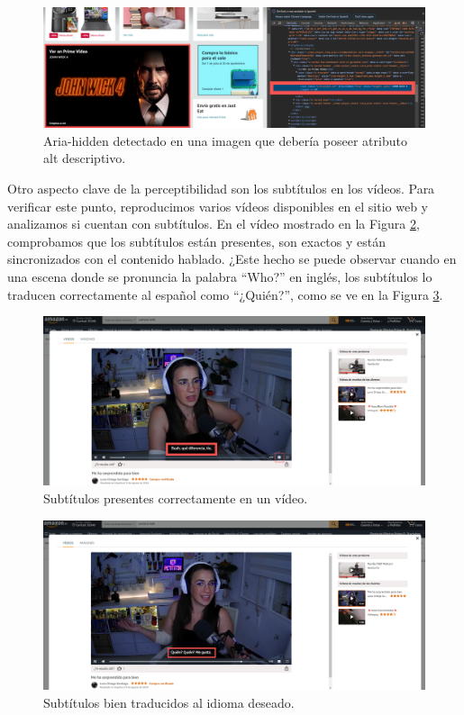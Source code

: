 \documentclass[letterpaper, 12pt]{report}
\begin{document}
\begin{figure}[H]
\centering
\includegraphics[width=1\textwidth]{figure5.png}
\caption{Aria-hidden detectado en una imagen que debería poseer atributo alt descriptivo.}
\label{fig:5}
\end{figure}

Otro aspecto clave de la perceptibilidad son los subtítulos en los vídeos. Para verificar este punto, reproducimos varios vídeos disponibles en el sitio web y analizamos si cuentan con subtítulos. En el vídeo mostrado en la Figura \ref{fig:6}, comprobamos que los subtítulos están presentes, son exactos y están sincronizados con el contenido hablado. ¿Este hecho se puede observar cuando en una escena donde se pronuncia la palabra ``Who?'' en inglés, los subtítulos lo traducen correctamente al español como ``¿Quién?'', como se ve en la Figura \ref{fig:7}.

\begin{figure}[H]
\centering
\includegraphics[width=1\textwidth]{figure6.png}
\caption{Subtítulos presentes correctamente en un vídeo.}
\label{fig:6}
\end{figure}

\begin{figure}[H]
\centering
\includegraphics[width=1\textwidth]{figure7.png}
\caption{Subtítulos bien traducidos al idioma deseado.}
\label{fig:7}
\end{figure}
\end{document}
